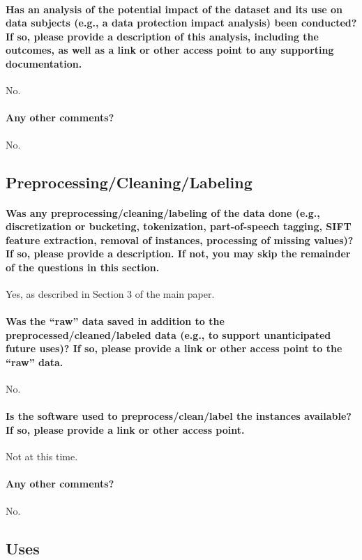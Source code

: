 \documentclass{article}
\begin{document}
\paragraph{Has an analysis of the potential impact of the dataset and its use
on data subjects (e.g., a data protection impact analysis) been conducted? If so, please provide a description of this analysis, including
the outcomes, as well as a link or other access point to any supporting
documentation.}
No.

\paragraph{Any other comments?}
No.

\subsection{Preprocessing/Cleaning/Labeling}

\paragraph{Was any preprocessing/cleaning/labeling of the data done (e.g.,
discretization or bucketing, tokenization, part-of-speech tagging,
SIFT feature extraction, removal of instances, processing of missing values)? If so, please provide a description. If not, you may skip the
remainder of the questions in this section.}
Yes, as described in Section 3 of the main paper.

\paragraph{Was the “raw” data saved in addition to the preprocessed/cleaned/labeled
data (e.g., to support unanticipated future uses)? If so, please provide a link or other access point to the “raw” data.}
No.

\paragraph{Is the software used to preprocess/clean/label the instances available? If so, please provide a link or other access point.}
Not at this time.

\paragraph{Any other comments?}
No.

\subsection{Uses}
\end{document}
